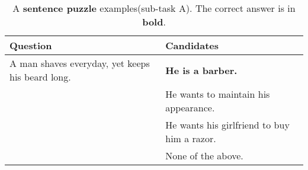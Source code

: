 \begin{table}
	\caption{A \textbf{sentence puzzle} examples(sub-task A). The correct answer is in \textbf{bold}.}
	\label{tab:sentence-puzzle-q}
	\begin{center}
		\begin{tabular}{p{3.5cm}|p{3.5cm}}
			\toprule
			Question                                         & Candidates                                  \\
			\midrule
			A man shaves everyday, yet keeps his beard long. & \textbf{He is a barber.}                    \\
			                                                 & He wants to maintain his appearance.        \\
			                                                 & He wants his girlfriend to buy him a razor. \\
			                                                 & None of the above.                           \\
			\bottomrule
		\end{tabular}
	\end{center}
\end{table}

